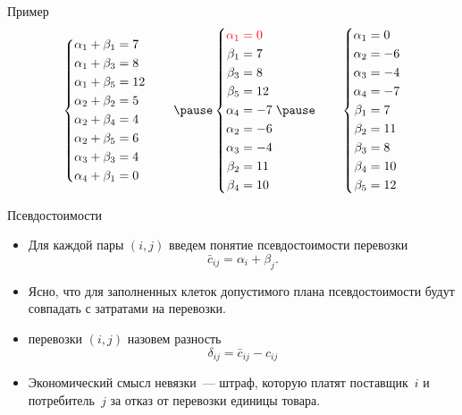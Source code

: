 \documentclass[unicode,11pt,notheorems,xcolor=table]{beamer}
\begin{document}
\begin{frame}{Пример}{}
	$$
	\left\lbrace
	\begin{aligned}
	\alpha_1+ \beta_1 &= 7\\
	\alpha_1+ \beta_3 &= 8\\
	\alpha_1+ \beta_5 &= 12\\
	\alpha_2+ \beta_2 &= 5\\
	\alpha_2+ \beta_4 &= 4\\
	\alpha_2+ \beta_5 &= 6\\
	\alpha_3+ \beta_3 &= 4\\
	\alpha_4+ \beta_1 &= 0\\
	\end{aligned}
	\right.
	\qquad
	\pause
	\left\lbrace
	\begin{aligned}
	{\color{red}\alpha_1 }&\; {\color{red} =  0 }\\
	\beta_1  &= 7 \\
	\beta_3  &= 8 \\
	\beta_5  &= 12\\
	\alpha_4 &=-7 \\
	\alpha_2 &=-6 \\
	\alpha_3 &=-4 \\
	\beta_2  &= 11\\
	\beta_4  &= 10\\
	\end{aligned}
	\right.
	\pause
	\qquad
	\left\lbrace
	\begin{aligned}
	\alpha_1 &= 0 \\
	\alpha_2 &=-6 \\
	\alpha_3 &=-4 \\
	\alpha_4 &=-7 \\
	\beta_1  &= 7 \\
	\beta_2  &= 11\\
	\beta_3  &= 8 \\
	\beta_4  &= 10\\
	\beta_5  &= 12\\
	\end{aligned}
	\right.
	$$
\end{frame}



\begin{frame}{Псевдостоимости}{}
	\begin{itemize}
		\item 
		Для каждой пары $(i,j)$
		введем понятие \alert{псевдостоимости перевозки}
		$$
		\bar{c}_{ij}=\alpha_i+\beta_j.
		$$
		
		\item
		Ясно, что для заполненных клеток допустимого плана псевдостоимости будут совпадать с затратами на перевозки. 
		
		\item
		 перевозки $(i,j)$ назовем разность 
		$$
		\delta_{ij} = \bar{c}_{ij}-c_{ij}
		$$
		\item Экономический смысл невязки~--- штраф, которую платят поставщик~$i$ и потребитель~$j$ за отказ от перевозки единицы товара.
		
	\end{itemize}
\end{frame}
\end{document}
